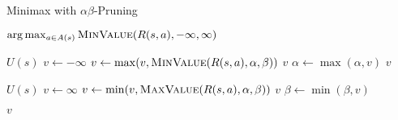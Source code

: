 \begin{algorithm}[H]
    \caption{Minimax with $\alpha\beta$-Pruning}
    \label{alg:alphabeta}
    \begin{algorithmic}[1]
    
        \State \Return $\arg\max_{a \in A(s)} \textproc{MinValue}(R(s, a), -\infty, \infty)$
    \EndProcedure
    \end{algorithmic}

    \begin{algorithmic}[1]

            \Return $U(s)$
        \EndIf
        \State $v \leftarrow -\infty$
            \State $v \leftarrow \max(v, \textproc{MinValue}(R(s, a), \alpha, \beta))$
                \Return $v$
            \EndIf
            \State $\alpha \leftarrow \max(\alpha, v)$
        \EndFor
        \State \Return $v$
    \EndProcedure
    
    \end{algorithmic}
        
    \begin{algorithmic}[1]

            \Return $U(s)$
        \EndIf
        \State $v \leftarrow \infty$
            \State $v \leftarrow \min(v, \textproc{MaxValue}(R(s, a), \alpha, \beta))$
                \Return $v$
            \EndIf
            \State $\beta \leftarrow \min(\beta, v)$
        \EndFor

        \State \Return $v$
    \EndProcedure

    \end{algorithmic}
\end{algorithm}